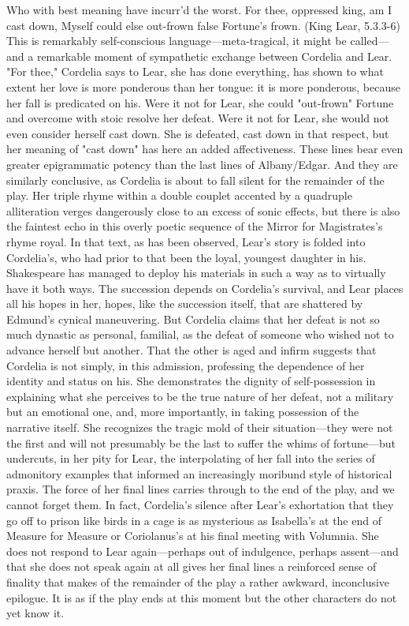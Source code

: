 Who with best meaning have incurr'd the worst.
For thee, oppressed king, am I cast down,
Myself could else out-frown false Fortune's frown. (King Lear, 5.3.3-6)
This is remarkably self-conscious language—meta-tragical, it might be called—and a remarkable moment of sympathetic exchange between Cordelia and Lear. "For thee," Cordelia says to Lear, she has done everything, has shown to what extent her love is more ponderous than her tongue: it is more ponderous, because her fall is predicated on his. Were it not for Lear, she could "out-frown" Fortune and overcome with stoic resolve her defeat. Were it not for Lear, she would not even consider herself cast down. She is defeated, cast down in that respect, but her meaning of "cast down" has here an added affectiveness. These lines bear even greater epigrammatic potency than the last lines of Albany/Edgar. And they are similarly conclusive, as Cordelia is about to fall silent for the remainder of the play. Her triple rhyme within a double couplet accented by a quadruple alliteration verges dangerously close to an excess of sonic effects, but there is also the faintest echo in this overly poetic sequence of the Mirror for Magistrates's rhyme royal. In that text, as has been observed, Lear's story is folded into Cordelia's, who had prior to that been the loyal, youngest daughter in his. Shakespeare has managed to deploy his materials in such a way as to virtually have it both ways. The succession depends on Cordelia's survival, and Lear places all his hopes in her, hopes, like the succession itself, that are shattered by Edmund's cynical maneuvering. But Cordelia claims that her defeat is not so much dynastic as personal, familial, as the defeat of someone who wished not to advance herself but another. That the other is aged and infirm suggests that Cordelia is not simply, in this admission, professing the dependence of her identity and status on his. She demonstrates the dignity of self-possession in explaining what she perceives to be the true nature of her defeat, not a military but an emotional one, and, more importantly, in taking possession of the narrative itself. She recognizes the tragic mold of their situation—they were not the first and will not presumably be the last to suffer the whims of fortune—but undercuts, in her pity for Lear, the interpolating of her fall into the series of admonitory examples that informed an increasingly moribund style of historical praxis. The force of her final lines carries through to the end of the play, and we cannot forget them. In fact, Cordelia's silence after Lear's exhortation that they go off to prison like birds in a cage is as mysterious as Isabella's at the end of Measure for Measure or Coriolanus's at his final meeting with Volumnia. She does not respond to Lear again—perhaps out of indulgence, perhaps assent—and that she does not speak again at all gives her final lines a reinforced sense of finality that makes of the remainder of the play a rather awkward, inconclusive epilogue. It is as if the play ends at this moment but the other characters do not yet know it.
